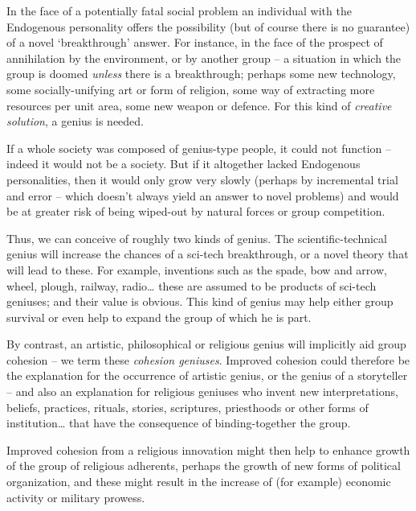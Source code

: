 \documentclass[
]{book}
\begin{document}
In the face of a potentially fatal social problem an individual with the Endogenous personality offers the possibility (but of course there is no guarantee) of a novel `breakthrough' answer. For instance, in the face of the prospect of annihilation by the environment, or by another group -- a situation in which the group is doomed \emph{unless} there is a breakthrough; perhaps some new technology, some socially-unifying art or form of religion, some way of extracting more resources per unit area, some new weapon or defence. For this kind of \emph{creative solution}, a genius is needed.

If a whole society was composed of genius-type people, it could not function -- indeed it would not be a society. But if it altogether lacked Endogenous personalities, then it would only grow very slowly (perhaps by incremental trial and error -- which doesn't always yield an answer to novel problems) and would be at greater risk of being wiped-out by natural forces or group competition.

Thus, we can conceive of roughly two kinds of genius. The scientific-technical genius will increase the chances of a sci-tech breakthrough, or a novel theory that will lead to these. For example, inventions such as the spade, bow and arrow, wheel, plough, railway, radio\ldots{} these are assumed to be products of sci-tech geniuses; and their value is obvious. This kind of genius may help either group survival or even help to expand the group of which he is part.

By contrast, an artistic, philosophical or religious genius will implicitly aid group cohesion -- we term these \emph{cohesion geniuses}. Improved cohesion could therefore be the explanation for the occurrence of artistic genius, or the genius of a storyteller -- and also an explanation for religious geniuses who invent new interpretations, beliefs, practices, rituals, stories, scriptures, priesthoods or other forms of institution\ldots{} that have the consequence of binding-together the group.

Improved cohesion from a religious innovation might then help to enhance growth of the group of religious adherents, perhaps the growth of new forms of political organization, and these might result in the increase of (for example) economic activity or military prowess.
\end{document}

